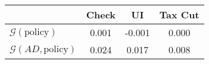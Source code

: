 \begin{tabular}{@{}lccc@{}}
\toprule
                          & Check      & UI    & Tax Cut    \\  \midrule
$\mathcal{G}(\text{policy})$ & 0.001  & -0.001  & 0.000     \\
$\mathcal{G}(AD,\text{policy})$ & 0.024  & 0.017  & 0.008     \\
\end{tabular}
